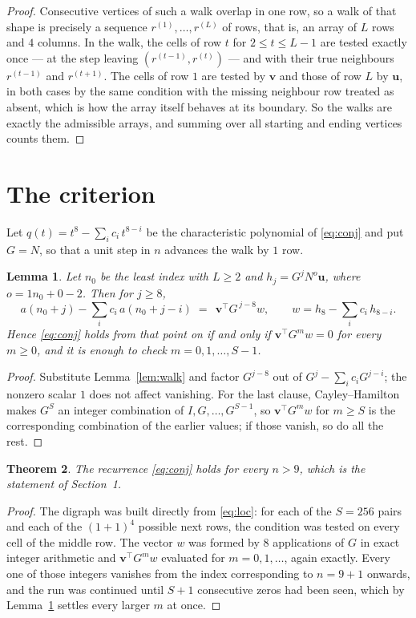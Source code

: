 \documentclass[11pt,a4paper]{article}
\theoremstyle{plain}
\newtheorem{theorem}{Theorem}
\newtheorem{lemma}[theorem]{Lemma}
\theoremstyle{definition}
\begin{document}
\begin{proof}
Consecutive vertices of such a walk overlap in one row, so a walk of that shape is
precisely a sequence $r^{(1)},\dots,r^{(L)}$ of rows, that is, an array of $L$ rows
and $4$ columns. In the walk, the cells of row $t$ for $2\le t\le L-1$ are tested
exactly once --- at the step leaving $(r^{(t-1)},r^{(t)})$ --- and with their true
neighbours $r^{(t-1)}$ and $r^{(t+1)}$. The cells of row $1$ are tested by
$\mathbf{v}$ and those of row $L$ by $\mathbf{u}$, in both cases by the same condition
with the missing neighbour row treated as absent, which is how the array itself behaves at
its boundary. So the walks are exactly the admissible arrays, and summing over all starting
and ending vertices counts them.
\end{proof}

\section{The criterion}

Let $q(t)=t^{8}-\sum_i c_i\,t^{8-i}$ be the characteristic polynomial of
\eqref{eq:conj} and put $G=N$, so that a unit step in $n$ advances the walk by
$1$ row.

\begin{lemma}\label{lem:crit}
Let $n_0$ be the least index with $L\ge2$ and $h_j=G^{j}N^{o}\mathbf{u}$, where
$o=1n_0+0-2$. Then for $j\ge8$,
\[
a(n_0+j)-\sum_i c_i\,a(n_0+j-i)\;=\;\,\mathbf{v}^{\!\top}G^{\,j-8}w,
\qquad w=h_{8}-\sum_i c_i\,h_{8-i} .
\]
Hence \eqref{eq:conj} holds from that point on if and only if
$\mathbf{v}^{\!\top}G^{m}w=0$ for every $m\ge0$, and it is enough to check
$m=0,1,\dots,S-1$.
\end{lemma}

\begin{proof}
Substitute Lemma~\ref{lem:walk} and factor $G^{j-8}$ out of
$G^{j}-\sum_ic_iG^{j-i}$; the nonzero scalar $1$ does not affect
vanishing. For the last clause, Cayley--Hamilton makes $G^{S}$ an integer combination of
$I,G,\dots,G^{S-1}$, so $\mathbf{v}^{\!\top}G^{m}w$ for $m\ge S$ is the corresponding
combination of the earlier values; if those vanish, so do all the rest.
\end{proof}

\begin{theorem}
The recurrence \eqref{eq:conj} holds for every $n>9$, which is the statement of
Section~1.
\end{theorem}

\begin{proof}
The digraph was built directly from \eqref{eq:loc}: for each of the $S=256$ pairs and each
of the $(1+1)^{4}$ possible next rows, the condition was tested on every cell of
the middle row. The vector $w$ was formed by $8$ applications of $G$ in exact integer
arithmetic and $\mathbf{v}^{\!\top}G^{m}w$ evaluated for $m=0,1,\dots$, again exactly.
Every one of those integers vanishes from the index corresponding to $n=9+1$ onwards,
and the run was continued until $S+1$ consecutive zeros had been seen, which by
Lemma~\ref{lem:crit} settles every larger $m$ at once.
\end{proof}
\end{document}
